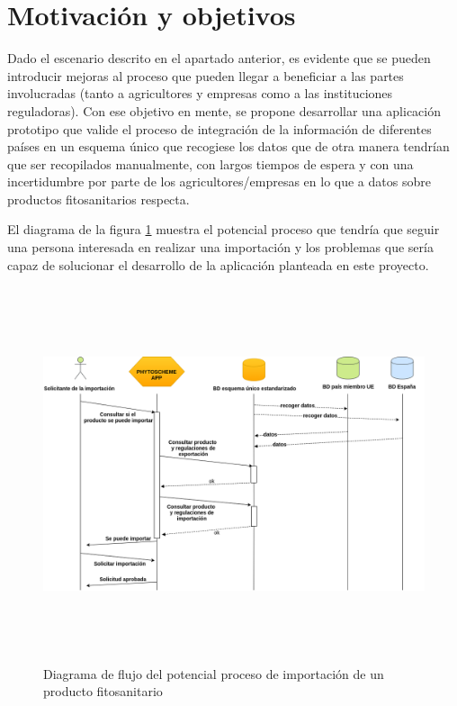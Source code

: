 \section{Motivación y objetivos} \label{phytoscheme.motivacion}
Dado el escenario descrito en el apartado anterior, es evidente que se pueden introducir mejoras al proceso que pueden llegar a beneficiar a las partes involucradas (tanto a agricultores y empresas como a las instituciones reguladoras). Con ese objetivo en mente, se propone desarrollar una aplicación prototipo que valide el proceso de integración de la información de diferentes países en un esquema único que recogiese los datos que de otra manera tendrían que ser recopilados manualmente, con largos tiempos de espera y con una incertidumbre por parte de los agricultores/empresas en lo que a datos sobre productos fitosanitarios respecta.\par 
El diagrama de la figura \ref{fig:flujo_potencial_importacion} muestra el potencial proceso que tendría que seguir una persona interesada en realizar una importación y los problemas que sería capaz de solucionar el desarrollo de la aplicación planteada en este proyecto.

\begin{figure}[!t]
    \centering
    \includegraphics[width=1\textwidth,height=11cm]{Imagenes/Diagrama_de_flujo_proceso_potencial_de_importacion_producto_fitosanitario}
    \caption{Diagrama de flujo del potencial  proceso de importación de un producto fitosanitario}
    \label{fig:flujo_potencial_importacion}
\end{figure}
\par

